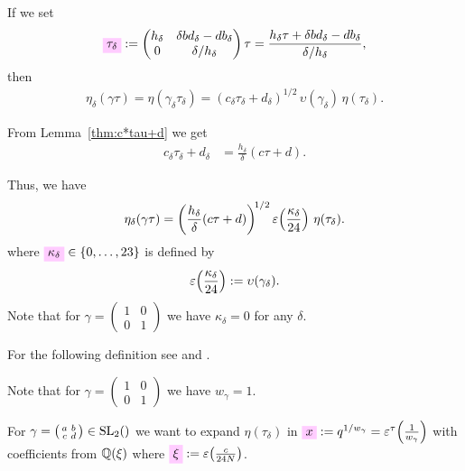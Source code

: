 \documentclass{article}
\begin{document}
If we set
\begin{gather}
  \defineNotation[tau-delta]{\tau_\delta}
  :=
  \begin{pmatrix}
    h_\delta & \delta b d_\delta-d b_\delta\\
    0       & \delta / h_\delta
  \end{pmatrix} \tau
  =
  \frac{h_\delta\tau+\delta b d_\delta-d b_\delta}{\delta/h_\delta},
  \label{eq:tau_delta}
\end{gather}
then
\begin{gather*}
  \eta_\delta(\gamma\tau)
  =
  \eta(\gamma_\delta \tau_\delta)
  =
  (c_\delta\tau_\delta+d_\delta)^{1/2}
  \,
  \upsilon(\gamma_\delta)
  \,
  \eta(\tau_\delta).
\end{gather*}


From Lemma~\ref{thm:c*tau+d} we get
\begin{align*}
  c_\delta\tau_\delta+d_\delta
  &=
  \frac{h_\delta}{\delta}(c \tau + d).
\end{align*}

Thus, we have
\begin{gather}
\eta_\delta(\gamma\tau)
=
\left(\frac{h_\delta}{\delta}(c \tau+d)\right)^{\!1/2}
\varepsilon\!\left(\frac{\kappa_\delta}{24}\right)
\,
\eta(\tau_\delta).
\label{eq:eta_delta(gamma*tau)}
\end{gather}
where
$\defineNotation[kappa-delta]{\kappa_\delta} \in \Set{0,\ldots,23}$ is
defined by
\begin{gather}
  \label{eq:kappa_delta}
  \varepsilon\!\left(\frac{\kappa_\delta}{24}\right) := \upsilon(\gamma_\delta).
\end{gather}
Note that for
$\gamma=\left(\begin{smallmatrix}1&0\\0&1\end{smallmatrix}\right)$ we
have $\kappa_\delta=0$ for any $\delta$.


For the following definition see \cite[Lemma~2.37]{Radu_PhD_2010} and
\cite[Definition~2.9]{Radu_PhD_2010}.


Note that for
$\gamma=\left(\begin{smallmatrix}1&0\\0&1\end{smallmatrix}\right)$ we
have $w_\gamma=1$.


For
$\gamma =
\bigl(
\begin{smallmatrix}
  a & b\\
  c & d
\end{smallmatrix}
\bigr) \in \SL2Z$ we want to expand $\eta(\tau_\delta)$ in
$\defineNotation[x]{x}:=q^{1/w_\gamma}=\unityPowerTau{\frac{1}{w_\gamma}}$
with coefficients from $\mathbb{Q}(\xi)$ where
$\defineNotation[xi]{\xi} := \unityPower{\frac{c}{24N}}$.
\end{document}
